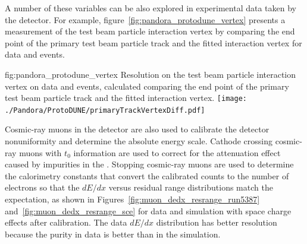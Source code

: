 A number of these variables can be also explored in experimental data taken by the  detector. %
For example, figure~\ref{fig:pandora_protodune_vertex} presents a measurement of the test beam particle interaction vertex by comparing the end point of the primary test beam particle track and the fitted interaction vertex for  data and  events. 



\begin{dunefigure}
{fig:pandora_protodune_vertex}
{Resolution on the test beam particle interaction vertex on  data and  events, calculated comparing the end point of the primary test beam particle track and the fitted interaction vertex.}
\texttt{[image: ./Pandora/ProtoDUNE/primaryTrackVertexDiff.pdf]}
\end{dunefigure}


Cosmic-ray muons in the  detector are also used to calibrate the detector nonuniformity and determine the absolute energy scale. Cathode crossing cosmic-ray muons with $t_{0}$ information are used to correct for the attenuation effect caused by impurities in the \lar. Stopping cosmic-ray muons are used to determine the calorimetry constants that convert the calibrated  counts to the number of electrons so that the $dE/dx$ versus residual range distributions match the expectation, as shown in Figures~\ref{fig:muon_dedx_resrange_run5387} and~\ref{fig:muon_dedx_resrange_sce} for  data and  simulation with space charge effects after calibration. The data $dE/dx$ distribution has better resolution because the purity in data is better than in the simulation. 

